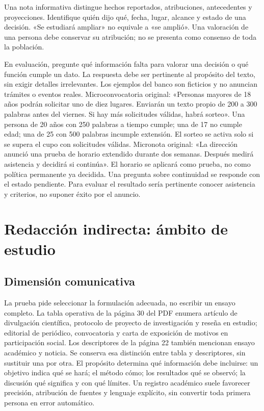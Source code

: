 Una nota informativa distingue hechos reportados, atribuciones, antecedentes y proyecciones. Identifique quién dijo qué, fecha, lugar, alcance y estado de una decisión. «Se estudiará ampliar» no equivale a «se amplió». Una valoración de una persona debe conservar su atribución; no se presenta como consenso de toda la población.

En evaluación, pregunte qué información falta para valorar una decisión o qué función cumple un dato. La respuesta debe ser pertinente al propósito del texto, sin exigir detalles irrelevantes. Los ejemplos del banco son ficticios y no anuncian trámites o eventos reales.
Microconvocatoria original: «Personas mayores de 18 años podrán solicitar uno de diez lugares. Enviarán un texto propio de 200 a 300 palabras antes del viernes. Si hay más solicitudes válidas, habrá sorteo». Una persona de 20 años con 250 palabras a tiempo cumple; una de 17 no cumple edad; una de 25 con 500 palabras incumple extensión. El sorteo se activa solo si se supera el cupo con solicitudes válidas.
Micronota original: «La dirección anunció una prueba de horario extendido durante dos semanas. Después medirá asistencia y decidirá si continúa». El horario se aplicará como prueba, no como política permanente ya decidida. Una pregunta sobre continuidad se responde con el estado pendiente. Para evaluar el resultado sería pertinente conocer asistencia y criterios, no suponer éxito por el anuncio.

\section{Redacción indirecta: ámbito de estudio}\label{sec:e1}
\subsection{Dimensión comunicativa}
La prueba pide seleccionar la formulación adecuada, no escribir un ensayo completo. La tabla operativa de la página 30 del PDF enumera artículo de divulgación científica, protocolo de proyecto de investigación y reseña en estudio; editorial de periódico, convocatoria y carta de exposición de motivos en participación social. Los descriptores de la página 22 también mencionan ensayo académico y noticia. Se conserva esa distinción entre tabla y descriptores, sin sustituir una por otra. El propósito determina qué información debe incluirse: un objetivo indica qué se hará; el método cómo; los resultados qué se observó; la discusión qué significa y con qué límites. Un registro académico suele favorecer precisión, atribución de fuentes y lenguaje explícito, sin convertir toda primera persona en error automático.

